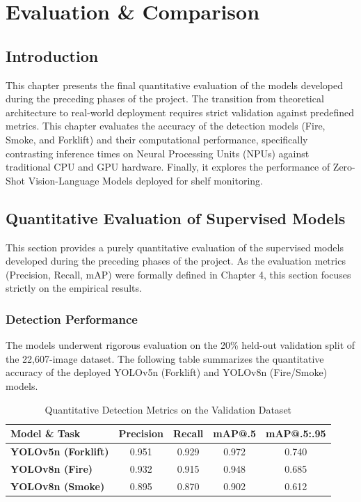 ﻿\chapter{Evaluation \& Comparison}
\label{chap:phase5-evaluation}

\section*{Introduction}
This chapter presents the final quantitative evaluation of the models developed during the preceding phases of the project. The transition from theoretical architecture to real-world deployment requires strict validation against predefined metrics. This chapter evaluates the accuracy of the detection models (Fire, Smoke, and Forklift) and their computational performance, specifically contrasting inference times on Neural Processing Units (NPUs) against traditional CPU and GPU hardware. Finally, it explores the performance of Zero-Shot Vision-Language Models deployed for shelf monitoring.

\section{Quantitative Evaluation of Supervised Models}
This section provides a purely quantitative evaluation of the supervised models developed during the preceding phases of the project. As the evaluation metrics (Precision, Recall, mAP) were formally defined in Chapter 4, this section focuses strictly on the empirical results.

\subsection{Detection Performance}
The models underwent rigorous evaluation on the 20\% held-out validation split of the 22,607-image dataset. The following table summarizes the quantitative accuracy of the deployed YOLOv5n (Forklift) and YOLOv8n (Fire/Smoke) models.

\begin{table}[h]
\centering
\caption{Quantitative Detection Metrics on the Validation Dataset}
\renewcommand{\arraystretch}{1.2}
\begin{tabular}{|l|c|c|c|c|}
\hline
\textbf{Model \& Task} & \textbf{Precision} & \textbf{Recall} & \textbf{mAP@.5} & \textbf{mAP@.5:.95} \\
\hline
\textbf{YOLOv5n (Forklift)} & 0.951 & 0.929 & 0.972 & 0.740 \\
\hline
\textbf{YOLOv8n (Fire)} & 0.932 & 0.915 & 0.948 & 0.685 \\
\hline
\textbf{YOLOv8n (Smoke)} & 0.895 & 0.870 & 0.902 & 0.612 \\
\hline
\end{tabular}
\end{table}

